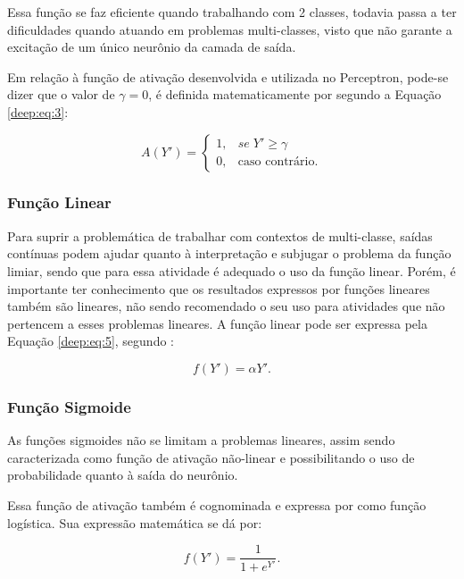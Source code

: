 Essa função se faz eficiente quando trabalhando com 2 classes, todavia passa a ter dificuldades quando atuando em problemas multi-classes, visto que não garante a excitação de um único neurônio da camada de saída.

Em relação à função de ativação desenvolvida e utilizada no Perceptron, pode-se dizer que o valor de $\gamma = 0$, é definida matematicamente por \cite{mcculloch1943logical} segundo a Equação \ref{deep:eq:3}:

\begin{equation}
    \label{deep:eq:3}
    A(Y') = \left\{\begin{matrix}
     1,& se \; Y' \geq \gamma \\ 
     0,& \text{caso contrário}.
    \end{matrix}\right.
\end{equation}


\subsubsection{Função Linear}
Para suprir a problemática de trabalhar com contextos de multi-classe, saídas contínuas podem ajudar quanto à interpretação e subjugar o problema da função limiar, sendo que para essa atividade é adequado o uso da função linear. Porém, é importante ter conhecimento que os resultados expressos por funções lineares também são lineares, não sendo recomendado o seu uso para atividades que não pertencem a esses problemas lineares. A função linear pode ser expressa pela Equação \ref{deep:eq:5}, segundo \cite{Rosenblatt1958}:

\begin{equation}
    \label{deep:eq:5}
    f(Y') = \alpha Y'.
\end{equation}


\subsubsection{Função Sigmoide}
As funções sigmoides não se limitam a problemas lineares, assim sendo caracterizada como função de ativação não-linear e possibilitando o uso de probabilidade quanto à saída do neurônio.

Essa função de ativação também é cognominada e expressa por \cite{glorot2011deep} como função logística. Sua expressão matemática se dá por:

\begin{equation}
    \label{deep:eq:6}
    f(Y') = \frac{1}{1 + e^{Y'}}.
\end{equation}

